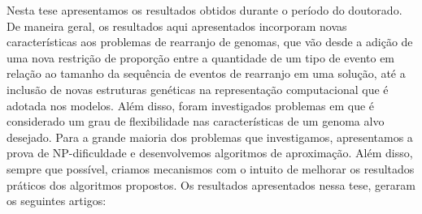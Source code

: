 
Nesta tese apresentamos os resultados obtidos durante o período do doutorado. De maneira geral, os resultados aqui apresentados incorporam novas características aos problemas de rearranjo de genomas, que vão desde a adição de uma nova restrição de proporção entre a quantidade de um tipo de evento em relação ao tamanho da sequência de eventos de rearranjo em uma solução, até a inclusão de novas estruturas genéticas na representação computacional que é adotada nos modelos. Além disso, foram investigados problemas em que é considerado um grau de flexibilidade nas características de um genoma alvo desejado. Para a grande maioria dos problemas que investigamos, apresentamos a prova de NP-dificuldade e desenvolvemos algoritmos de aproximação. Além disso, sempre que possível, criamos mecanismos com o intuito de melhorar os resultados práticos dos algoritmos propostos. Os resultados apresentados nessa tese, geraram os seguintes artigos:

